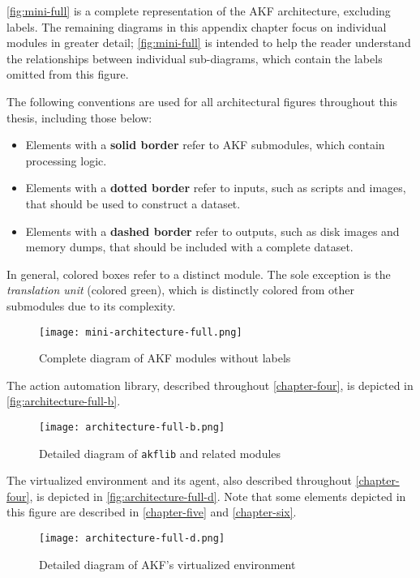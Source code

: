 \autoref{fig:mini-full} is a complete representation of the AKF
architecture, excluding labels. The remaining diagrams in this appendix
chapter focus on individual modules in greater detail;
\autoref{fig:mini-full} is intended to help the reader understand the
relationships between individual sub-diagrams, which contain the labels
omitted from this figure.

The following conventions are used for all architectural figures
throughout this thesis, including those below:

\begin{itemize}
\tightlist
\item
  Elements with a \textbf{solid border} refer to AKF submodules, which
  contain processing logic.
\item
  Elements with a \textbf{dotted border} refer to inputs, such as
  scripts and images, that should be used to construct a dataset.
\item
  Elements with a \textbf{dashed border} refer to outputs, such as disk
  images and memory dumps, that should be included with a complete
  dataset.
\end{itemize}

In general, colored boxes refer to a distinct module. The sole exception
is the \emph{translation unit} (colored green), which is distinctly
colored from other submodules due to its complexity.

\begin{figure}[htbp]
\centering
\texttt{[image: mini-architecture-full.png]}
\caption{Complete diagram of AKF modules without
labels}\label{fig:mini-full}
\end{figure}

The action automation library, described throughout \autoref{chapter-four}, is depicted in \autoref{fig:architecture-full-b}.

\begin{figure}[htbp]
\centering
\texttt{[image: architecture-full-b.png]}
\caption{Detailed diagram of \passthrough{\lstinline!akflib!} and
related modules}\label{fig:architecture-full-b}
\end{figure}

The virtualized environment and its agent, also described throughout
\autoref{chapter-four}, is depicted in
\autoref{fig:architecture-full-d}. Note that some elements depicted in
this figure are described in \autoref{chapter-five} and
\autoref{chapter-six}.

\begin{figure}[htbp]
\centering
\texttt{[image: architecture-full-d.png]}
\caption{Detailed diagram of AKF's virtualized
environment}\label{fig:architecture-full-d}
\end{figure}

